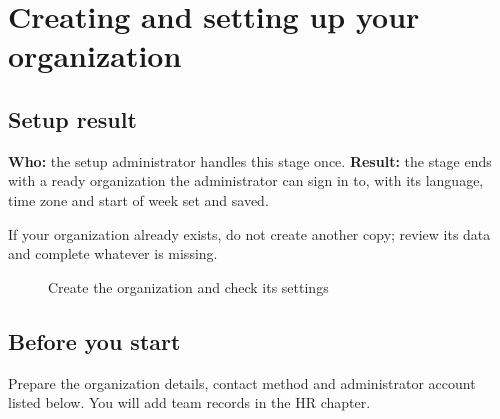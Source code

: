 \chapter{Creating and setting up your organization}
\label{ch:org-setup}

\section{Setup result}
\label{sec:setup-minute}

\textbf{Who:} the setup administrator handles this stage once. \textbf{Result:} the stage ends with a ready organization the administrator can sign in to, with its language, time zone and start of week set and saved.

If your organization already exists, do not create another copy; review its data and complete whatever is missing.

\begin{figure}[H]
\centering
{}
\rclegend
\caption{Create the organization and check its settings}
\label{fig:setup-steps}
\end{figure}

\section{Before you start}
\label{sec:setup-before}

Prepare the organization details, contact method and administrator account listed below. You will add team records in the HR chapter.

